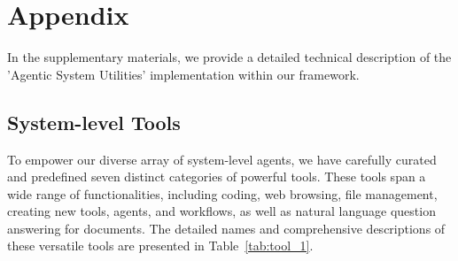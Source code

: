 
\section{Appendix}\label{sec:system_agent}
In the supplementary materials, we provide a detailed technical description of the 'Agentic System Utilities' implementation within our \model framework.

\subsection{System-level Tools}
To empower our diverse array of system-level agents, we have carefully curated and predefined seven distinct categories of powerful tools. These tools span a wide range of functionalities, including coding, web browsing, file management, creating new tools, agents, and workflows, as well as natural language question answering for documents. The detailed names and comprehensive descriptions of these versatile tools are presented in Table~\ref{tab:tool_1}.

